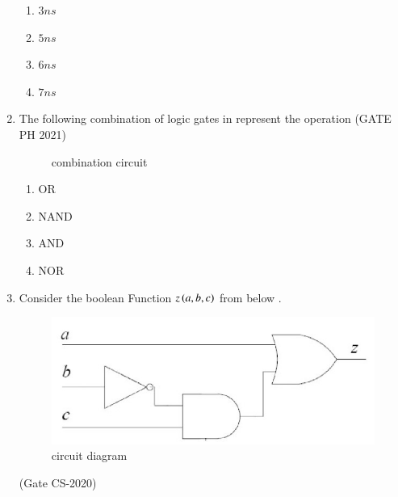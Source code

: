 \begin{enumerate}[label=\arabic*.,ref=\theenumi]
\begin{enumerate}
    \item $3 ns$
    \item $5 ns$
    \item $6 ns$
    \item $7 ns$
\end{enumerate}
\item  The following combination of logic gates
in
	represent the operation
 \hfill(GATE PH 2021)
	      \begin{figure}[H]
		      \centering
		      \resizebox{0.75\columnwidth}{!}{%
		      
		      }
	              \caption{combination circuit}
		      \label{fig:GATE PH 2021}
	      \end{figure}

	\begin{enumerate}
       \item OR
       \item NAND
       \item AND
       \item NOR
   \end{enumerate}
\item Consider the boolean Function $z\left(a,b,c\right)$ from below 
			.
		\begin{figure}[H]
			\centering
			\includegraphics[width=0.75\columnwidth]{figs/203.png}
			\caption{circuit diagram}
			\label{fig:203}
		\end{figure}
		
	\hfill{(Gate CS-2020)}
	

\end{enumerate}
